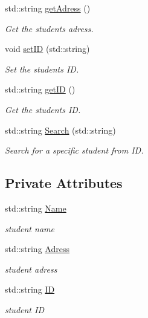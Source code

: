 \begin{DoxyCompactItemize}
std\+::string \hyperlink{classStudent_aeb78f390f160a1bcad595e7487cdf881}{get\+Adress} ()
\begin{DoxyCompactList}\small\item\em Get the student\textquotesingle{}s adress. \end{DoxyCompactList}\item 
void \hyperlink{classStudent_ab9bba1e271f7aebdbba115311873482a}{set\+ID} (std\+::string)
\begin{DoxyCompactList}\small\item\em Set the student\textquotesingle{}s ID. \end{DoxyCompactList}\item 
std\+::string \hyperlink{classStudent_a87fcf0ef568c017d246b559c31db5857}{get\+ID} ()
\begin{DoxyCompactList}\small\item\em Get the student\textquotesingle{}s ID. \end{DoxyCompactList}\item 
std\+::string \hyperlink{classStudent_a5c1c6529f21a650b318e4c0220f32a47}{Search} (std\+::string)
\begin{DoxyCompactList}\small\item\em Search for a specific student from ID. \end{DoxyCompactList}\end{DoxyCompactItemize}
\subsection*{Private Attributes}
\begin{DoxyCompactItemize}
\item 
std\+::string \hyperlink{classStudent_a914e02c29156e1a3b1b51cad6bbc9083}{Name}
\begin{DoxyCompactList}\small\item\em student name \end{DoxyCompactList}\item 
std\+::string \hyperlink{classStudent_a2ce7f219072c295b7f3bc95db09625f3}{Adress}
\begin{DoxyCompactList}\small\item\em student adress \end{DoxyCompactList}\item 
std\+::string \hyperlink{classStudent_a1ae2688ebf463a93d001465c510f8970}{ID}
\begin{DoxyCompactList}\small\item\em student ID \end{DoxyCompactList}\end{DoxyCompactItemize}



